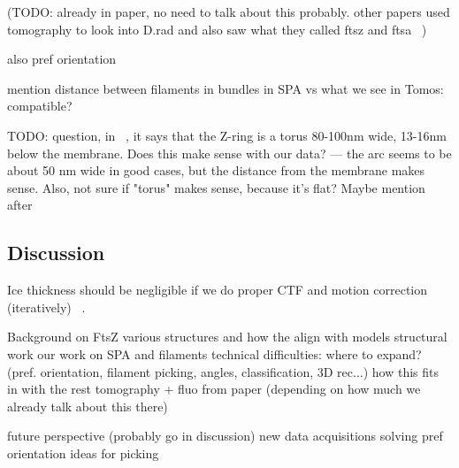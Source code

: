 (TODO: already in paper, no need to talk about this probably. other papers used tomography to look into D.rad and also saw what they called ftsz and ftsa ~\cite{sextonSuperresolutionConfocalCryoCLEM2022})

also pref orientation

mention distance between filaments in bundles in SPA vs what we see in Tomos: compatible?

TODO: question, in ~\cite{mcquillenInsightsStructureFunction2020}, it says that the Z-ring is a torus 80-100nm wide, 13-16nm below the membrane. Does this make sense with our data? --- the arc seems to be about 50 nm wide in good cases, but the distance from the membrane makes sense. Also, not sure if "torus" makes sense, because it's flat? Maybe mention after

\subsection{Discussion}

Ice thickness should be negligible if we do proper CTF and motion correction (iteratively) ~\cite{aiyerOvercomingResolutionAttenuation2024}.

\begin{outline}
\1 Background on FtsZ
    \2 various structures and how the align with models
\1 structural work
    \2 our work on SPA and filaments
        \3 technical difficulties: where to expand? (pref. orientation, filament picking, angles, classification, 3D rec...)
    \2 how this fits in with the rest
    \2 tomography + fluo from paper (depending on how much we already talk about this there)

\1 future perspective (probably go in discussion)
    \2 new data acquisitions
    \2 solving pref orientation
    \2 ideas for picking
\end{outline}
